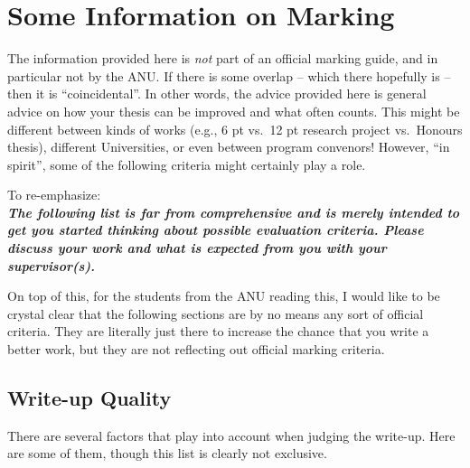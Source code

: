 \chapter{Some Information on Marking}\label{chap:Marking}

The information provided here is \emph{not} part of an official marking guide, and in particular not by the ANU. If there is some overlap -- which there hopefully is -- then it is ``coincidental''. In other words, the advice provided here is general advice on how your thesis can be improved and what often counts. This might be different between kinds of works (e.g., 6 pt vs.\ 12 pt research project vs.\ Honours thesis), different Universities, or even between program convenors! However, ``in spirit'', some of the following criteria might certainly play a role.

To re-emphasize:\\[.5em]
\emph{\textbf{The following list is far from comprehensive and is merely intended to get you started thinking about possible evaluation criteria. Please discuss your work and what is expected from you with your supervisor(s).}}

On top of this, for the students from the ANU reading this, I would like to be crystal clear that the following sections are by no means any sort of official criteria. They are literally just there to increase the chance that you write a better work, but they are not reflecting out official marking criteria.

\section{Write-up Quality}

There are several factors that play into account when judging the write-up. Here are some of them, though this list is clearly not exclusive.

